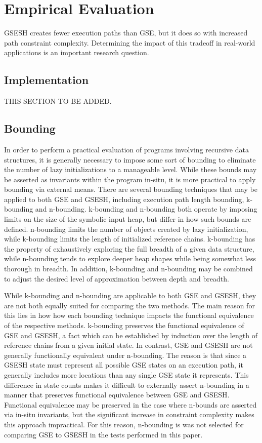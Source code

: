 \section{Empirical Evaluation}
GSESH creates fewer execution paths than GSE, but it does so with increased path constraint complexity. Determining the impact of this tradeoff in real-world applications is an important research question. 

\subsection{Implementation}
THIS SECTION TO BE ADDED.

\subsection{Bounding}
In order to perform a practical evaluation of programs involving recursive data structures, it is generally necessary to impose some sort of bounding to eliminate the number of lazy initializations to a manageable level. While these bounds may be asserted as invariants within the program in-situ, it is more practical to apply bounding via external means. There are several bounding techniques that may be applied to both GSE and GSESH, including execution path length bounding, k-bounding and n-bounding. k-bounding and n-bounding both operate by imposing limits on the size of the symbolic input heap, but differ in how such bounds are defined. n-bounding limits the number of objects created by lazy initialization, while k-bounding limits the length of initialized reference chains. k-bounding has the property of exhaustively exploring the full breadth of a given data structure, while n-bounding tends to explore deeper heap shapes while being somewhat less thorough in breadth. In addition, k-bounding and n-bounding may be combined to adjust the desired level of approximation between depth and breadth. 

While k-bounding and n-bounding are applicable to both GSE and GSESH, they are not both equally suited for comparing the two methods. The main reason for this lies in how how each bounding technique impacts the functional equivalence of the respective methods.  k-bounding preserves the functional equivalence of GSE and GSESH, a fact which can be established by induction over the length of reference chains from a given initial state. In contrast, GSE and GSESH are not generally functionally equivalent under n-bounding. The reason is that since a GSESH state must represent all possible GSE states on an execution path, it generally includes more locations than any single GSE state it represents. This difference in state counts makes it difficult to externally assert n-bounding in a manner that preserves functional equivalence between GSE and GSESH. Functional equivalence may be preserved in the case where n-bounds are asserted via in-situ invariants, but the significant increase in constraint complexity makes this approach impractical. For this reason, n-bounding is was not selected for comparing GSE to GSESH in the tests performed in this paper.

